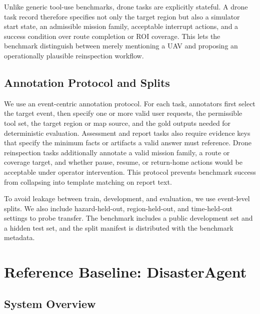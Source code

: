 \documentclass{article}
\begin{document}
Unlike generic tool-use benchmarks, drone tasks are explicitly stateful. A drone task record therefore specifies not only the target region but also a simulator start state, an admissible mission family, acceptable interrupt actions, and a success condition over route completion or ROI coverage. This lets the benchmark distinguish between merely mentioning a UAV and proposing an operationally plausible reinspection workflow.

\subsection{Annotation Protocol and Splits}

We use an event-centric annotation protocol. For each task, annotators first select the target event, then specify one or more valid user requests, the permissible tool set, the target region or map source, and the gold outputs needed for deterministic evaluation. Assessment and report tasks also require evidence keys that specify the minimum facts or artifacts a valid answer must reference. Drone reinspection tasks additionally annotate a valid mission family, a route or coverage target, and whether pause, resume, or return-home actions would be acceptable under operator intervention. This protocol prevents benchmark success from collapsing into template matching on report text.

To avoid leakage between train, development, and evaluation, we use event-level splits. We also include hazard-held-out, region-held-out, and time-held-out settings to probe transfer. The benchmark includes a public development set and a hidden test set, and the split manifest is distributed with the benchmark metadata.

\section{Reference Baseline: DisasterAgent}

\subsection{System Overview}
\end{document}
